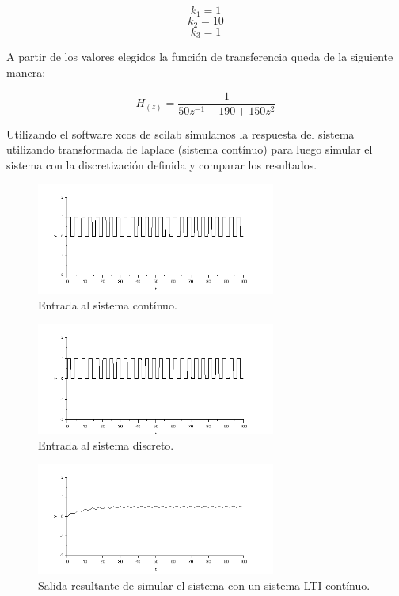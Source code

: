 \documentclass{article}
\begin{document}
$$ k_1 =1$$
$$k_2 =10$$
$$k_3=1$$

A partir de los valores elegidos la función de transferencia queda de la siguiente manera:

$$H_{(z)} = \frac{1}{50 z^{-1} - 190 + 150 z^{2}}$$

Utilizando el software xcos de scilab simulamos la respuesta del sistema utilizando transformada de laplace (sistema contínuo) para luego simular el sistema con la discretización definida y comparar los resultados.

        \begin{figure}[h!]
            \centering
            \includegraphics[width=0.7\textwidth]{./Imagenes/Simulaciones/entradaContinua.png}
            \caption{Entrada al sistema contínuo.}
            \label{entradaContinua}
        \end{figure}

        \begin{figure}[h!]
            \centering
            \includegraphics[width=0.7\textwidth]{./Imagenes/Simulaciones/entradaDiscreta.png}
            \caption{Entrada al sistema discreto.}
            \label{entradaDiscreta}
        \end{figure}
        
         \begin{figure}[h!]
            \centering
            \includegraphics[width=0.7\textwidth]{./Imagenes/Simulaciones/salidaContinua.png}
            \caption{Salida resultante de simular el sistema con un sistema LTI contínuo.}
            \label{salidaContinua}
        \end{figure}
        
\end{document}
